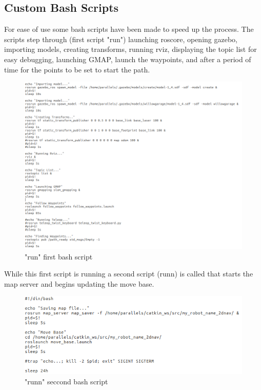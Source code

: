 \documentclass[a4paper, 10pt]{IEEEconf}
\begin{document}

\subsection{Custom Bash Scripts}

For ease of use some bash scripts have been made to speed up the process. The scripts step through (first script "run") launching roscore, opening gazebo, importing models, creating transforms, running rviz, displaying the topic list for easy debugging, launching GMAP, launch the waypoints, and after a period of time for the points to be set to start the path. 

\begin{figure}[H]
  \includegraphics[width=0.8\linewidth, center]{images/run}
  \caption{"run" first bash script}
  \label{fig:"run" first bash script}
\end{figure}

While this first script is running a second script (runn) is called that starts the map server and begins updating the move base.

\begin{figure}[H]
  \includegraphics[width=0.8\linewidth, center]{images/runn}
  \caption{"runn" seccond bash script}
  \label{fig:"runn" seccond bash script}
\end{figure}
\end{document}
